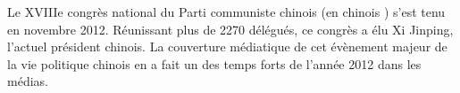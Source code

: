 Le XVIIIe congrès national du Parti communiste chinois (en chinois ) s'est tenu en novembre 2012. Réunissant plus de 2270 délégués, ce congrès a élu Xi Jinping, l'actuel président chinois. La couverture médiatique de cet évènement majeur de la vie politique chinois en a fait un des temps forts de l'année 2012 dans les médias.

\begin{figure}[h!]
    \centering
    \newline

\end{figure}
